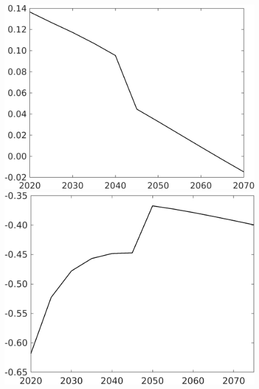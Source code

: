 \documentclass[12pt]{article}
\begin{document}
\begin{figure}[h!!]
\begin{minipage}[]{0.32\textwidth}
	\end{minipage}
	\begin{minipage}[]{0.32\textwidth}
		\includegraphics[width=1\textwidth]{../../codding_model/own_basedOnFried/optimalPol_010922_revision/figures/all_13Sept22/CompTaufPER_bytaul_Equlab_Reg0_gAn_spillover0_nsk0_xgr0_knspil0_sep1_LFlimit1_emsbase0_countec0_GovRev0_etaa0.79_lgd0.png}
	\end{minipage}	
	\begin{minipage}[]{0.32\textwidth}
		\includegraphics[width=1\textwidth]{../../codding_model/own_basedOnFried/optimalPol_010922_revision/figures/all_13Sept22/CompTaufPER_bytaul_Equlab_Reg0_Lf_spillover0_nsk0_xgr0_knspil0_sep1_LFlimit1_emsbase0_countec0_GovRev0_etaa0.79_lgd0.png}

\end{minipage}
\end{figure}
\end{document}
